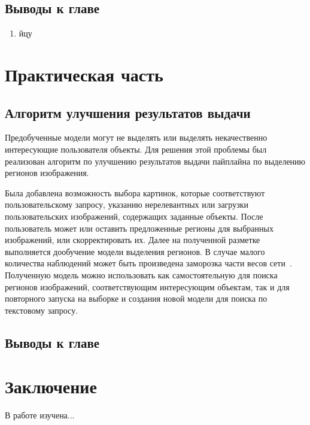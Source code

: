 \documentclass[a4paper,14pt]{article}
\begin{document}
    \subsection{Выводы к главе \thesection}
    \begin{enumerate}
        [1)]
        \itemsep0em
        \item йцу
    \end{enumerate}

    \newpage


    \section{Практическая часть}

    \subsection{Алгоритм улучшения результатов выдачи}
    
    Предобученные модели могут не выделять или выделять некачественно интересующие пользователя объекты.
    Для решения этой проблемы был реализован алгоритм по улучшению результатов выдачи пайплайна по выделению регионов изображения.
    
    Была добавлена возможность выбора картинок, которые соответствуют пользовательскому запросу, указанию нерелевантных или загрузки пользовательских изображений, содержащих заданные объекты.
    После пользователь может или оставить предложенные регионы для выбранных изображений, или скорректировать их.
    Далее на полученной разметке выполняется дообучение модели выделения регионов.
    В случае малого количества наблюдений может быть произведена заморозка части весов сети~\cite{wang2020few}.
    Полученную модель можно использовать как самостоятельную для поиска регионов изображений, соответствующим интересующим объектам, так и для повторного запуска на выборке и создания новой модели для поиска по текстовому запросу.
    

    \subsection{Выводы к главе \thesection}



    \newpage


    \section{Заключение}

    В работе изучена...

    \newpage
    \renewcommand{\refname}{{\normalsize \hfill Список использованных источников \hfill}}
%    
    
    
    \newpage
\end{document}
